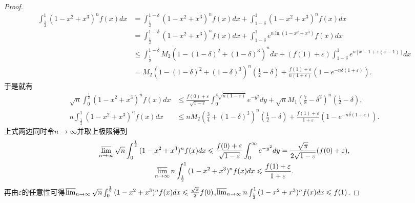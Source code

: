 \documentclass[lang=cn,newtx,10pt,scheme=chinese]{elegantbook}
\begin{document}
\begin{proof}
\begin{align*}
\int_{\frac{1}{2}}^1{(1 - x^2 + x^3)^nf(x)dx}&=\int_{\frac{1}{2}}^{1 - \delta}{(1 - x^2 + x^3)^nf(x)dx}+\int_{1 - \delta}^1{(1 - x^2 + x^3)^nf(x)dx}\\
&=\int_{\frac{1}{2}}^{1 - \delta}{(1 - x^2 + x^3)^nf(x)dx}+\int_{1 - \delta}^1{e^{n\ln(1 - x^2 + x^3)}f(x)dx}\\
&\leqslant \int_{\frac{1}{2}}^{1 - \delta}{M_2\left(1-(1-\delta)^2+(1 - \delta)^3\right)^ndx}+(f(1) + \varepsilon)\int_{1 - \delta}^1{e^{n[x - 1 + \varepsilon(x - 1)]}dx}\\
&=M_2\left(1-(1-\delta)^2+(1 - \delta)^3\right)^n\left(\frac{1}{2}-\delta\right)+\frac{f(1) + \varepsilon}{n(1 + \varepsilon)}\left(1 - e^{-n\delta(1 + \varepsilon)}\right).
\end{align*}
于是就有
\begin{align*}
\sqrt{n}\int_0^{\frac{1}{2}}{(1 - x^2 + x^3)^nf(x)dx}&\leqslant \frac{f(0) + \varepsilon}{\sqrt{1 - \varepsilon}}\int_0^{\delta\sqrt{n(1 - \varepsilon)}}{e^{-y^2}dy}+\sqrt{n} M_1\left(\frac{7}{8}-\delta^2\right)^n\left(\frac{1}{2}-\delta\right),\\
n\int_{\frac{1}{2}}^1{(1 - x^2 + x^3)^nf(x)dx}&\leqslant n M_2\left(\frac{3}{4}+(1 - \delta)^3\right)^n\left(\frac{1}{2}-\delta\right)+\frac{f(1) + \varepsilon}{1 + \varepsilon}\left(1 - e^{-n\delta(1 + \varepsilon)}\right).
\end{align*}
上式两边同时令\(n\rightarrow\infty\)并取上极限得到
\begin{gather*}
\varlimsup_{n\rightarrow\infty}\sqrt{n}\int_0^{\frac{1}{2}}{(1 - x^2 + x^3)^nf(x)dx}\leqslant \frac{f(0) + \varepsilon}{\sqrt{1 - \varepsilon}}\int_0^{\infty}{e^{-y^2}dy}=\frac{\sqrt{\pi}}{2\sqrt{1 - \varepsilon}}(f(0) + \varepsilon),\\
\varlimsup_{n\rightarrow\infty}n\int_{\frac{1}{2}}^1{(1 - x^2 + x^3)^nf(x)dx}\leqslant \frac{f(1) + \varepsilon}{1 + \varepsilon}.
\end{gather*}
再由\(\varepsilon\)的任意性可得\(\varlimsup_{n\rightarrow\infty}\sqrt{n}\int_0^{\frac{1}{2}}{(1 - x^2 + x^3)^nf(x)dx}\leqslant \frac{\sqrt{\pi}}{2}f(0)\),\(\varlimsup_{n\rightarrow\infty}n\int_{\frac{1}{2}}^1{(1 - x^2 + x^3)^nf(x)dx}\leqslant f(1)\).


\end{proof}
\end{document}
